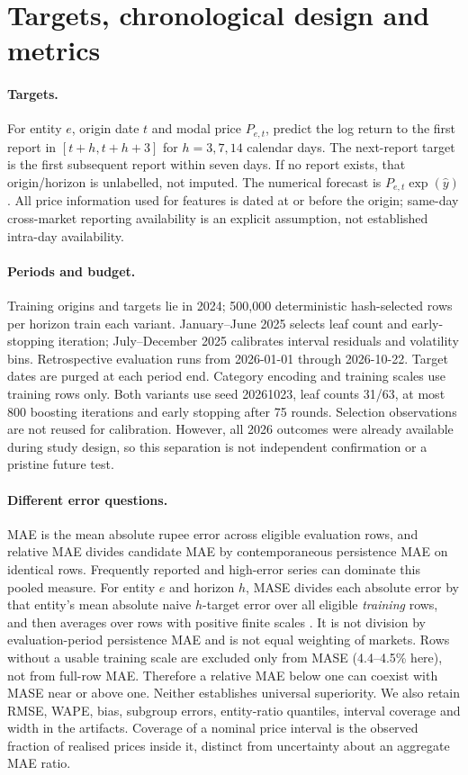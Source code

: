 \section{Targets, chronological design and metrics}\label{sec:protocol}
\paragraph{Targets.} For entity $e$, origin date $t$ and modal price $P_{e,t}$, predict the log return to the first report in $[t+h,t+h+3]$ for $h=3,7,14$ calendar days. The next-report target is the first subsequent report within seven days. If no report exists, that origin/horizon is unlabelled, not imputed. The numerical forecast is $P_{e,t}\exp(\hat y)$. All price information used for features is dated at or before the origin; same-day cross-market reporting availability is an explicit assumption, not established intra-day availability.

\paragraph{Periods and budget.} Training origins and targets lie in 2024; 500,000 deterministic hash-selected rows per horizon train each variant. January--June 2025 selects leaf count and early-stopping iteration; July--December 2025 calibrates interval residuals and volatility bins. Retrospective evaluation runs from 2026-01-01 through 2026-10-22. Target dates are purged at each period end. Category encoding and training scales use training rows only. Both variants use seed 20261023, leaf counts 31/63, at most 800 boosting iterations and early stopping after 75 rounds. Selection observations are not reused for calibration. However, all 2026 outcomes were already available during study design, so this separation is not independent confirmation or a pristine future test.

\paragraph{Different error questions.} MAE is the mean absolute rupee error across eligible evaluation rows, and relative MAE divides candidate MAE by contemporaneous persistence MAE on identical rows. Frequently reported and high-error series can dominate this pooled measure. For entity $e$ and horizon $h$, MASE divides each absolute error by that entity's mean absolute naive $h$-target error over all eligible \emph{training} rows, and then averages over rows with positive finite scales \cite{hyndman2006another}. It is not division by evaluation-period persistence MAE and is not equal weighting of markets. Rows without a usable training scale are excluded only from MASE (4.4--4.5\% here), not from full-row MAE. Therefore a relative MAE below one can coexist with MASE near or above one. Neither establishes universal superiority.
We also retain RMSE, WAPE, bias, subgroup errors, entity-ratio quantiles, interval coverage and width in the artifacts. Coverage of a nominal price interval is the observed fraction of realised prices inside it, distinct from uncertainty about an aggregate MAE ratio.

